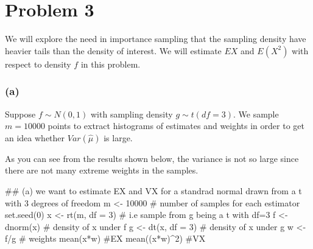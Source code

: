 \documentclass{article}
\begin{document}




\newpage
\section*{Problem 3}
We will explore the need in importance sampling that the sampling density have heavier tails than
the density of interest. We will estimate $EX$ and $E(X^2)$ with respect to density $f$ in this problem.

\subsubsection*{(a)}
\hspace{12 pt} Suppose $f\sim N(0,1)$ with sampling density $g\sim t(df=3)$. We sample $m=10000$ points
to extract histograms of estimates and weights in order to get an idea whether $Var(\hat\mu)$ is large.

As you can see from the results shown below, the variance is not so large since there are not many extreme
weights in the samples.

## (a) we want to estimate EX and VX for a standrad normal drawn from a t with 3 degrees of freedom
m <- 10000 # number of samples for each estimator
set.seed(0)
x <- rt(m, df = 3)  # i.e sample from g being a t with df=3
f <- dnorm(x)  # density of x under f
g <- dt(x, df = 3)  # density of x under g
w <- f/g  # weights
mean(x*w) #EX
mean((x*w)^2) #VX
\end{document}
